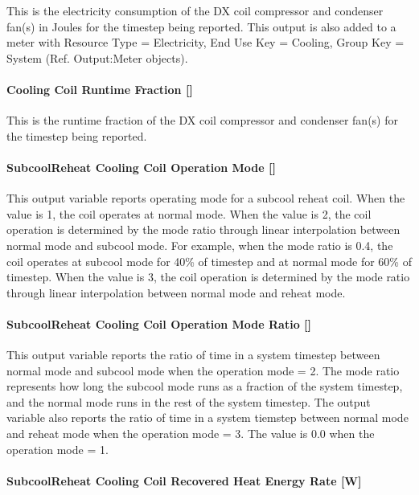 This is the electricity consumption of the DX coil compressor and condenser fan(s) in Joules for the timestep being reported. This output is also added to a meter with Resource Type = Electricity, End Use Key = Cooling, Group Key = System (Ref. Output:Meter objects).

\paragraph{Cooling Coil Runtime Fraction {[]}}

This is the runtime fraction of the DX coil compressor and condenser fan(s) for the timestep being reported.

\paragraph{SubcoolReheat Cooling Coil Operation Mode {[]}}\label{subcoolreheat-cooling-coil-operation-mode}

This output variable reports operating mode for a subcool reheat coil. When the value is 1, the coil operates at normal mode. When the value is 2, the coil operation is determined by the mode ratio through linear interpolation between normal mode and subcool mode. For example, when the mode ratio is 0.4, the coil operates at subcool mode for 40\% of timestep and at normal mode for 60\% of timestep. When the value is 3, the coil operation is determined by the mode ratio through linear interpolation between normal mode and reheat mode.

\paragraph{SubcoolReheat Cooling Coil Operation Mode Ratio {[]}}\label{subcoolreheat-cooling-coil-operation-mode-ratio}

This output variable reports the ratio of time in a system timestep between normal mode and subcool mode when the operation mode = 2. The mode ratio represents how long the subcool mode runs as a fraction of the system timestep, and the normal mode runs in the rest of the system timestep. The output variable also reports the ratio of time in a system tiemstep between normal mode and reheat mode when the operation mode = 3. The value is 0.0 when the operation mode = 1.

\paragraph{SubcoolReheat Cooling Coil Recovered Heat Energy Rate {[}W{]}}\label{subcoolreheat-cooling-coil-recovered-heat-energy-rate-w}

